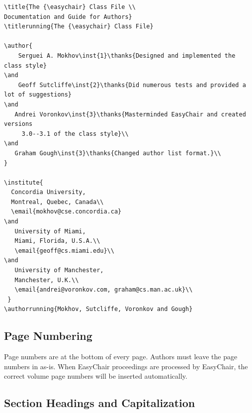 \documentclass{imav2013}
\newcommand{\easychair}{\textsf{easychair}}
\begin{document}

\begin{verbatim}
\title{The {\easychair} Class File \\
Documentation and Guide for Authors}
\titlerunning{The {\easychair} Class File}

\author{
    Serguei A. Mokhov\inst{1}\thanks{Designed and implemented the class style}
\and
    Geoff Sutcliffe\inst{2}\thanks{Did numerous tests and provided a lot of suggestions}
\and
   Andrei Voronkov\inst{3}\thanks{Masterminded EasyChair and created versions
     3.0--3.1 of the class style}\\
\and
   Graham Gough\inst{3}\thanks{Changed author list format.}\\
}

\institute{
  Concordia University,
  Montreal, Quebec, Canada\\
  \email{mokhov@cse.concordia.ca}
\and
   University of Miami,
   Miami, Florida, U.S.A.\\
   \email{geoff@cs.miami.edu}\\
\and
   University of Manchester,
   Manchester, U.K.\\
   \email{andrei@voronkov.com, graham@cs.man.ac.uk}\\
 }
\authorrunning{Mokhov, Sutcliffe, Voronkov and Gough}

\end{verbatim}

\subsection{Page Numbering}
\label{sect:page-numbering}

Page numbers are at the bottom of every page. Authors must leave the
page numbers in as-is. When EasyChair proceedings are processed by
EasyChair, the correct volume page numbers will be inserted
automatically.

\subsection{Section Headings and Capitalization}
\label{sect:section-headings}
\end{document}
